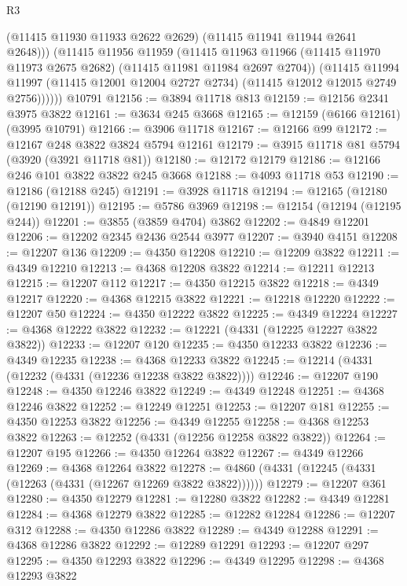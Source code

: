 \begin{lexlean}{R3}
\begin{coremodule}
              (@11415 @11930 @11933 @2622 @2629)
              (@11415 @11941 @11944 @2641 @2648)))
          (@11415
            @11956
            @11959
            (@11415
              @11963
              @11966
              (@11415 @11970 @11973 @2675 @2682)
              (@11415 @11981 @11984 @2697 @2704))
            (@11415
              @11994
              @11997
              (@11415 @12001 @12004 @2727 @2734)
              (@11415 @12012 @12015 @2749 @2756))))))
    @10791
@12156 := @3894 @11718 @813
@12159 := @12156 @2341 @3975 @3822
@12161 := @3634 @245 @3668
@12165 := @12159 (@6166 @12161) (@3995 @10791)
@12166 := @3906 @11718
@12167 := @12166 @99
@12172 := @12167 @248 @3822 @3824 @5794 @12161
@12179 := @3915 @11718 @81 @5794 (@3920 (@3921 @11718 @81))
@12180 := @12172 @12179
@12186 := @12166 @246 @101 @3822 @3822 @245 @3668
@12188 := @4093 @11718 @53
@12190 := @12186 (@12188 @245)
@12191 := @3928 @11718
@12194 := @12165 (@12180 (@12190 @12191))
@12195 := @5786 @3969
@12198 := @12154 (@12194 (@12195 @244))
@12201 := @3855 (@3859 @4704) @3862
@12202 := @4849 @12201
@12206 := @12202 @2345 @2436 @2544 @3977
@12207 := @3940 @4151
@12208 := @12207 @136
@12209 := @4350 @12208
@12210 := @12209 @3822
@12211 := @4349 @12210
@12213 := @4368 @12208 @3822
@12214 := @12211 @12213
@12215 := @12207 @112
@12217 := @4350 @12215 @3822
@12218 := @4349 @12217
@12220 := @4368 @12215 @3822
@12221 := @12218 @12220
@12222 := @12207 @50
@12224 := @4350 @12222 @3822
@12225 := @4349 @12224
@12227 := @4368 @12222 @3822
@12232 := @12221 (@4331 (@12225 @12227 @3822 @3822))
@12233 := @12207 @120
@12235 := @4350 @12233 @3822
@12236 := @4349 @12235
@12238 := @4368 @12233 @3822
@12245 := @12214 (@4331 (@12232 (@4331 (@12236 @12238 @3822 @3822))))
@12246 := @12207 @190
@12248 := @4350 @12246 @3822
@12249 := @4349 @12248
@12251 := @4368 @12246 @3822
@12252 := @12249 @12251
@12253 := @12207 @181
@12255 := @4350 @12253 @3822
@12256 := @4349 @12255
@12258 := @4368 @12253 @3822
@12263 := @12252 (@4331 (@12256 @12258 @3822 @3822))
@12264 := @12207 @195
@12266 := @4350 @12264 @3822
@12267 := @4349 @12266
@12269 := @4368 @12264 @3822
@12278 := @4860 (@4331 (@12245 (@4331 (@12263 (@4331 (@12267 @12269 @3822 @3822))))))
@12279 := @12207 @361
@12280 := @4350 @12279
@12281 := @12280 @3822
@12282 := @4349 @12281
@12284 := @4368 @12279 @3822
@12285 := @12282 @12284
@12286 := @12207 @312
@12288 := @4350 @12286 @3822
@12289 := @4349 @12288
@12291 := @4368 @12286 @3822
@12292 := @12289 @12291
@12293 := @12207 @297
@12295 := @4350 @12293 @3822
@12296 := @4349 @12295
@12298 := @4368 @12293 @3822

\end{coremodule}
\end{lexlean}
